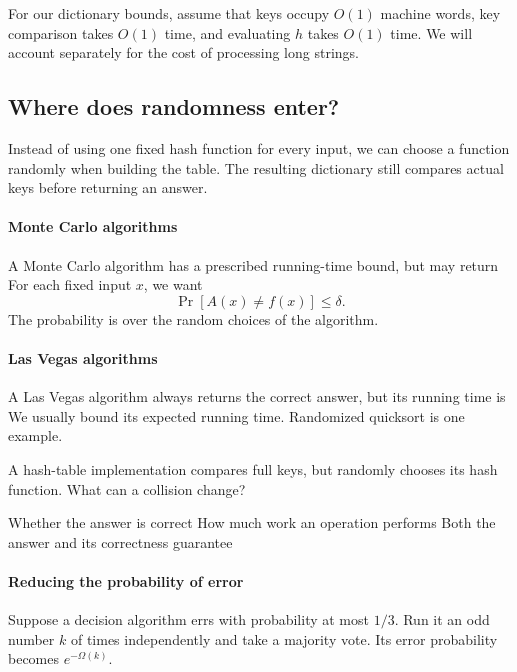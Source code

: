 \documentclass[11pt]{article}
\begin{document}
\vfill
For our dictionary bounds, assume that keys occupy $O(1)$ machine words,
key comparison takes $O(1)$ time, and evaluating $h$ takes $O(1)$ time.
We will account separately for the cost of processing long strings.

\newpage
\subsection*{Where does randomness enter?}
Instead of using one fixed hash function for every input, we can choose a
function randomly when building the table. The resulting dictionary still
compares actual keys before returning an answer.

\paragraph{Monte Carlo algorithms}
A Monte Carlo algorithm has a prescribed running-time bound, but may return
 For each fixed input $x$, we want
\begin{equation*}
    \Pr[A(x)\neq f(x)]\leq\delta.
\end{equation*}
The probability is over the random choices of the algorithm.

\paragraph{Las Vegas algorithms}
A Las Vegas algorithm always returns the correct answer, but its running time
is  We usually bound its expected running time.
Randomized quicksort is one example.

\begin{Qu}
    A hash-table implementation compares full keys, but randomly chooses its
    hash function. What can a collision change?
    \begin{itemize}
        \aitem Whether the answer is correct
        \bitem How much work an operation performs
        \citem Both the answer and its correctness guarantee
    \end{itemize}
\end{Qu}

\paragraph{Reducing the probability of error}
Suppose a decision algorithm errs with probability at most $1/3$. Run it an
odd number $k$ of times independently and take a majority vote. Its error
probability becomes $e^{-\Omega(k)}$.
\end{document}
